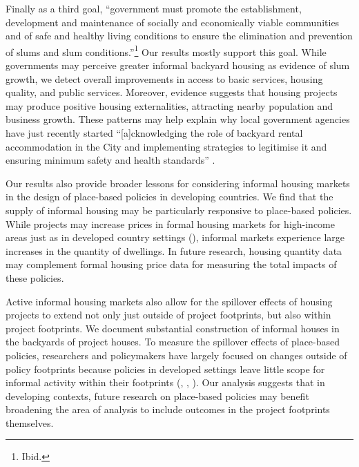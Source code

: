 \documentclass[12pt]{article}
\newcommand{\rv}{}
\begin{document}

Finally as a third goal, ``government must promote the establishment, development and maintenance of socially and economically viable communities and of safe and healthy living conditions to ensure the elimination and prevention of slums and slum conditions.''\footnote{Ibid.}  Our results mostly support this goal.  While governments may perceive greater informal backyard housing as evidence of slum growth, we detect overall improvements in access to basic services, housing quality, and public services.  Moreover, evidence suggests that housing projects \rv{may produce positive housing externalities}, attracting nearby population and business growth.  These patterns may help explain why local government agencies have just recently started ``[a]cknowledging the role of backyard rental accommodation in the City and implementing strategies to legitimise it and ensuring minimum safety and health standards'' \citep{sdf}.

Our results also provide broader lessons for considering informal housing markets in the design of place-based policies in developing countries.  We find that the supply of informal housing may be particularly responsive to place-based policies.  While projects may increase prices in formal housing markets for high-income areas just as in developed country settings (\cite{diamond2019wants}), informal markets experience large increases in the quantity of dwellings.  In future research, housing quantity data may complement formal housing price data for measuring the total impacts of these policies.  

Active informal housing markets also allow for the spillover effects of housing projects to extend not only just outside of project footprints, but also within project footprints.  We document substantial construction of informal houses in the backyards of project houses.  \rv{To measure the spillover effects of place-based policies, researchers and policymakers have largely focused on changes outside of policy footprints because policies in developed settings leave little scope for informal activity within their footprints (\cite{diamond2019wants}, \cite{rossi2010housing}, \cite{hornbeck2017creative}).  Our analysis suggests that in developing contexts, future research on place-based policies may benefit broadening the area of analysis to include outcomes in the project footprints themselves.}  
\end{document}
